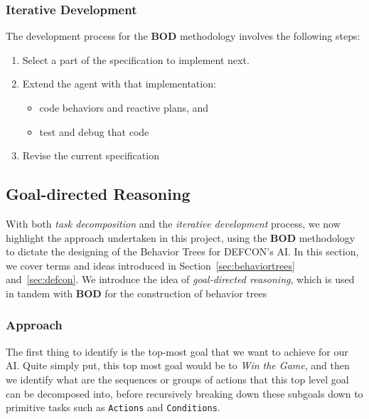         \subsubsection{Iterative Development}
        
        The development process for the \textbf{BOD} methodology involves the following steps:
        
        \begin{enumerate}
            \item Select a part of the specification to implement next.
            \item Extend the agent with that implementation:
                \begin{itemize}
                    \item code behaviors and reactive plans, and
                    \item test and debug that code
                \end{itemize}
            \item Revise the current specification
        \end{enumerate}  
        
        \subsection{Goal-directed Reasoning}
        
        With both \emph{task decomposition} and the \emph{iterative development} process, we now highlight the approach undertaken in this project, using the \textbf{BOD} methodology to dictate the designing of the Behavior Trees for DEFCON's AI. In this section, we cover terms and ideas introduced in Section~\ref{sec:behaviortrees} and~\ref{sec:defcon}. We introduce the idea of \emph{goal-directed reasoning}, which is used in tandem with \textbf{BOD} for the construction of behavior trees
        
        \subsubsection{ Approach }
        
        The first thing to identify is the top-most goal that we want to achieve for our AI. Quite simply put, this top most goal would be to \emph{Win the Game}, and then we identify what are the sequences or groups of actions that this top level goal can be decomposed into, before recursively breaking down these subgoals down to primitive tasks such as \texttt{Actions} and \texttt{Conditions}. 
        
